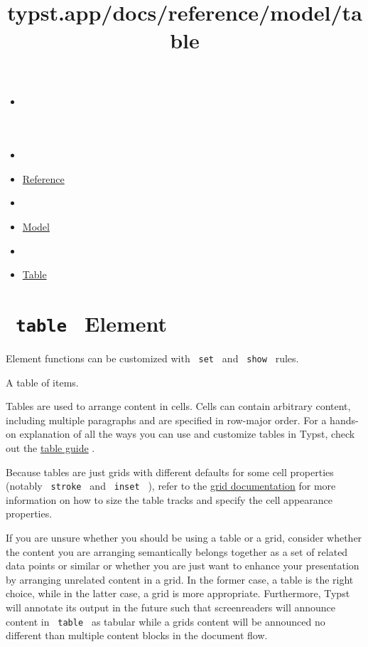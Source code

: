 \title{typst.app/docs/reference/model/table}

\begin{itemize}
\tightlist
\item
  \href{/docs}{}
\item
  
\item
  \href{/docs/reference/}{Reference}
\item
  
\item
  \href{/docs/reference/model/}{Model}
\item
  
\item
  \href{/docs/reference/model/table/}{Table}
\end{itemize}

\section{\texorpdfstring{\texttt{\ table\ } {{ Element
}}}{ table   Element }}\label{summary}

\label{element-tooltip}
Element functions can be customized with \texttt{\ set\ } and
\texttt{\ show\ } rules.

A table of items.

Tables are used to arrange content in cells. Cells can contain arbitrary
content, including multiple paragraphs and are specified in row-major
order. For a hands-on explanation of all the ways you can use and
customize tables in Typst, check out the
\href{/docs/guides/table-guide/}{table guide} .

Because tables are just grids with different defaults for some cell
properties (notably \texttt{\ stroke\ } and \texttt{\ inset\ } ), refer
to the \href{/docs/reference/layout/grid/}{grid documentation} for more
information on how to size the table tracks and specify the cell
appearance properties.

If you are unsure whether you should be using a table or a grid,
consider whether the content you are arranging semantically belongs
together as a set of related data points or similar or whether you are
just want to enhance your presentation by arranging unrelated content in
a grid. In the former case, a table is the right choice, while in the
latter case, a grid is more appropriate. Furthermore, Typst will
annotate its output in the future such that screenreaders will announce
content in \texttt{\ table\ } as tabular while a grid\textquotesingle s
content will be announced no different than multiple content blocks in
the document flow.

